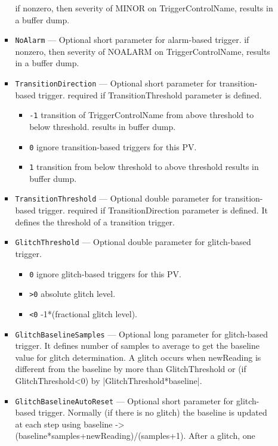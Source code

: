\begin{itemize}
\begin{itemize}
\begin{itemize}
                if nonzero, then severity of MINOR on TriggerControlName, results in a buffer dump.
        \item {\tt NoAlarm}  --- Optional short parameter for alarm-based trigger.
                if nonzero, then severity of NOALARM on TriggerControlName, results in a buffer dump.
        \item {\tt TransitionDirection}  --- Optional short parameter for transition-based trigger.
                required if TransitionThreshold parameter is defined.
\begin{itemize}
        \item {\tt -1}  transition of TriggerControlName from above threshold to below threshold.
                        results in buffer dump.
        \item {\tt 0}   ignore transition-based triggers for this PV.
        \item {\tt 1}   transition from below threshold to above threshold results in buffer dump.
\end{itemize}
        \item {\tt TransitionThreshold}  --- Optional double parameter for transition-based trigger.
                required if TransitionDirection parameter is defined. It defines the threshold of
                a transition trigger.
        \item {\tt GlitchThreshold} --- Optional double parameter for glitch-based trigger.
\begin{itemize}
        \item {\tt 0}   ignore glitch-based triggers for this PV.
        \item {\tt >0}   absolute glitch level.
        \item {\tt <0}   -1*(fractional glitch level).
\end{itemize}
        \item {\tt GlitchBaselineSamples} --- Optional long parameter for glitch-based trigger.
                It defines number of samples to average to get the baseline value for glitch determination.
                A glitch occurs when newReading is different from the baseline by more than GlitchThreshold
                or (if GlitchThreshold<0) by |GlitchThreshold*baseline|.
        \item {\tt GlitchBaselineAutoReset} --- Optional short parameter for glitch-based trigger.
                Normally (if there is no glitch) the baseline is updated at each step using
                baseline -> (baseline*samples+newReading)/(samples+1).  After a glitch, one 

\end{itemize}
\end{itemize}
\end{itemize}
